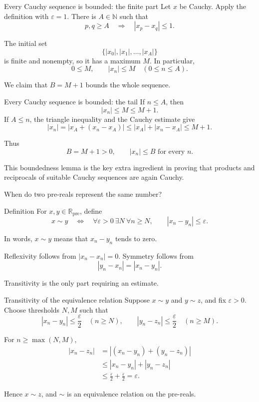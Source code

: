 \documentclass[aspectratio=169,11pt]{beamer}
\newcommand{\N}{\mathbb N}
\newcommand{\R}{\mathbb R}
\begin{document}
\begin{frame}{Every Cauchy sequence is bounded: the finite part}
  Let \(x\) be Cauchy.  Apply the definition with \(\varepsilon=1\).  There is
  \(A\in\N\) such that
  \[
    p,q\ge A
    \quad\Longrightarrow\quad
    |x_p-x_q|\le1.
  \]

  The initial set
  \[
    \{|x_0|,|x_1|,\ldots,|x_A|\}
  \]
  is finite and nonempty, so it has a maximum \(M\).  In particular,
  \[
    0\le M,
    \qquad
    |x_n|\le M\quad(0\le n\le A).
  \]

  We claim that \(B=M+1\) bounds the whole sequence.
\end{frame}

\begin{frame}{Every Cauchy sequence is bounded: the tail}
  If \(n\le A\), then
  \[
    |x_n|\le M\le M+1.
  \]
  If \(A\le n\), the triangle inequality and the Cauchy estimate give
  \[
    |x_n|
      =|x_A+(x_n-x_A)|
      \le |x_A|+|x_n-x_A|
      \le M+1.
  \]

  Thus
  \[
    \boxed{B=M+1>0,\qquad |x_n|\le B\text{ for every }n.}
  \]

  This boundedness lemma is the key extra ingredient in proving that products
  and reciprocals of suitable Cauchy sequences are again Cauchy.
\end{frame}

\begin{frame}{When do two pre-reals represent the same number?}
  \begin{block}{Definition}
    For \(x,y\in\R_{\mathrm{pre}}\), define
    \[
      x\sim y
      \quad\Longleftrightarrow\quad
      \forall\varepsilon>0\ \exists N\ \forall n\ge N,
      \qquad |x_n-y_n|\le\varepsilon.
    \]
  \end{block}

  In words, \(x\sim y\) means that \(x_n-y_n\) tends to zero.

  Reflexivity follows from \(|x_n-x_n|=0\).  Symmetry follows from
  \[
    |y_n-x_n|=|x_n-y_n|.
  \]

  Transitivity is the only part requiring an estimate.
\end{frame}

\begin{frame}{Transitivity of the equivalence relation}
  Suppose \(x\sim y\) and \(y\sim z\), and fix \(\varepsilon>0\).  Choose
  thresholds \(N,M\) such that
  \[
    |x_n-y_n|\le\frac\varepsilon2\quad(n\ge N),
    \qquad
    |y_n-z_n|\le\frac\varepsilon2\quad(n\ge M).
  \]

  For \(n\ge\max(N,M)\),
  \begin{align*}
    |x_n-z_n|
      &=|(x_n-y_n)+(y_n-z_n)|\\
      &\le |x_n-y_n|+|y_n-z_n|\\
      &\le \frac\varepsilon2+\frac\varepsilon2
       =\varepsilon.
  \end{align*}

  Hence \(x\sim z\), and \(\sim\) is an equivalence relation on the
  pre-reals.
\end{frame}
\end{document}
